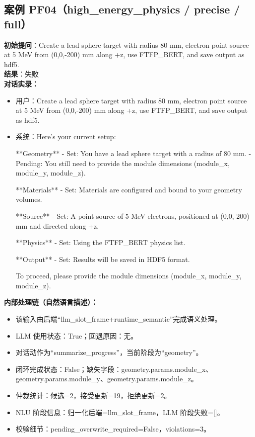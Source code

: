 \documentclass[11pt]{ctexart}
\begin{document}
\subsection{案例 PF04（high\_energy\_physics / precise / full）}
\textbf{初始提问}：Create a lead sphere target with radius 80 mm, electron point source at 5 MeV from (0,0,-200) mm along +z, use FTFP\_BERT, and save output as hdf5.\\
\textbf{结果}：失败\\
\textbf{对话实录：}
\begin{itemize}
\item 用户：Create a lead sphere target with radius 80 mm, electron point source at 5 MeV from (0,0,-200) mm along +z, use FTFP\_BERT, and save output as hdf5.
\item 系统：Here's your current setup:

**Geometry**
- Set: You have a lead sphere target with a radius of 80 mm.
- Pending: You still need to provide the module dimensions (module\_x, module\_y, module\_z).

**Materials**
- Set: Materials are configured and bound to your geometry volumes.

**Source**
- Set: A point source of 5 MeV electrons, positioned at (0,0,-200) mm and directed along +z.

**Physics**
- Set: Using the FTFP\_BERT physics list.

**Output**
- Set: Results will be saved in HDF5 format.

To proceed, please provide the module dimensions (module\_x, module\_y, module\_z).
\end{itemize}
\textbf{内部处理链（自然语言描述）：}
\begin{itemize}
\item 该输入由后端“llm\_slot\_frame+runtime\_semantic”完成语义处理。
\item LLM 使用状态：True；回退原因：无。
\item 对话动作为“summarize\_progress”，当前阶段为“geometry”。
\item 闭环完成状态：False；缺失字段：geometry.params.module\_x、geometry.params.module\_y、geometry.params.module\_z。
\item 仲裁统计：候选=2，接受更新=19，拒绝更新=2。
\item NLU 阶段信息：归一化后端=llm\_slot\_frame，LLM 阶段失败=[]。
\item 校验细节：pending\_overwrite\_required=False，violations=3。
\end{itemize}
\end{document}
